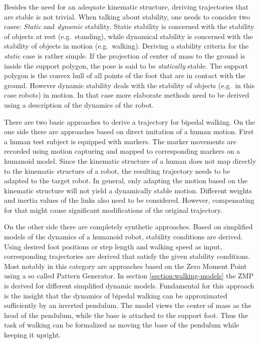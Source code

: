\documentclass[english,ngerman]{KITreprt}
\begin{document}
Besides the need for an adequate kinematic structure, deriving
trajectories that are stable is not trivial. When talking about
stability, one needs to consider two cases: \emph{Static} and
\emph{dynamic} stability. Static stability is concerned with the
stability of objects at rest (e.g.~standing), while dynamical stability
is concerned with the stability of objects in motion (e.g.~walking).
Deriving a stability criteria for the \emph{static} case is rather
simple. If the projection of center of mass to the ground is inside the
support polygon, the pose is said to be \emph{statically} stable. The
support polygon is the convex hull of all points of the foot that are in
contact with the ground. However dynamic stability deals with the
stability of objects (e.g.~in this case robots) in motion. In that case
more elaborate methods need to be derived using a description of the
dynamics of the robot.

There are two basic approaches to derive a trajectory for bipedal
walking. On the one side there are approaches based on direct imitation
of a human motion. First a human test subject is equipped with markers.
The marker movements are recorded using motion capturing and mapped to
corresponding markers on a humanoid model. Since the kinematic structure
of a human does not map directly to the kinematic structure of a robot,
the resulting trajectory needs to be adapted to the target robot. In
general, only adapting the motion based on the kinematic structure will
not yield a dynamically stable motion. Different weights and inertia
values of the links also need to be considered. However, compensating
for that might cause significant modifications of the original
trajectory.

On the other side there are completely synthetic approaches. Based on
simplified models of the dynamics of a humanoid robot, stability
conditions are derived. Using desired foot positions or step length and
walking speed as input, corresponding trajectories are derived that
satisfy the given stability conditions. Most notably in this category
are approaches based on the Zero Moment Point using a so called Pattern
Generator. In section \ref{section:walking-models} the ZMP is derived
for different simplified dynamic models. Fundamental for this approach
is the insight that the dynamics of bipedal walking can be approximated
sufficiently by an inverted pendulum. The model views the center of mass
as the head of the pendulum, while the base is attached to the support
foot. Thus the task of walking can be formalized as moving the base of
the pendulum while keeping it upright.
\end{document}
